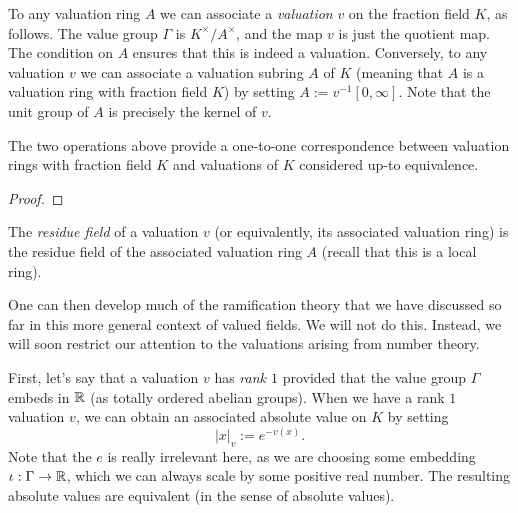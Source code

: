 To any valuation ring $A$ we can associate a \emph{valuation} $v$ on the fraction field $K$, as follows.
The value group $\Gamma$ is $K^{\times}/A^{\times}$, and the map $v$ is just the quotient map.
The condition on $A$ ensures that this is indeed a valuation.
Conversely, to any valuation $v$ we can associate a valuation subring $A$ of $K$ (meaning that $A$ is a valuation ring with fraction field $K$) by setting $A := v^{-1}[0,\infty]$.
Note that the unit group of $A$ is precisely the kernel of $v$.

\begin{lemma}
  The two operations above provide a one-to-one correspondence between valuation rings with fraction field $K$ and valuations of $K$ considered up-to equivalence.
\end{lemma}
\begin{proof}
\end{proof}

The \emph{residue field} of a valuation $v$ (or equivalently, its associated valuation ring) is the residue field of the associated valuation ring $A$ (recall that this is a local ring).

One can then develop much of the ramification theory that we have discussed so far in this more general context of valued fields.
We will not do this.
Instead, we will soon restrict our attention to the valuations arising from number theory.

First, let's say that a valuation $v$ has \emph{rank $1$} provided that the value group $\Gamma$ embeds in $\mathbb{R}$ (as totally ordered abelian groups).
When we have a rank $1$ valuation $v$, we can obtain an associated absolute value on $K$ by setting
\[ |x|_{v} := e^{-v(x)}. \]
Note that the $e$ is really irrelevant here, as we are choosing some embedding $\iota : \Gamma \to \mathbb{R}$, which we can always scale by some positive real number.
The resulting absolute values are equivalent (in the sense of absolute values).

